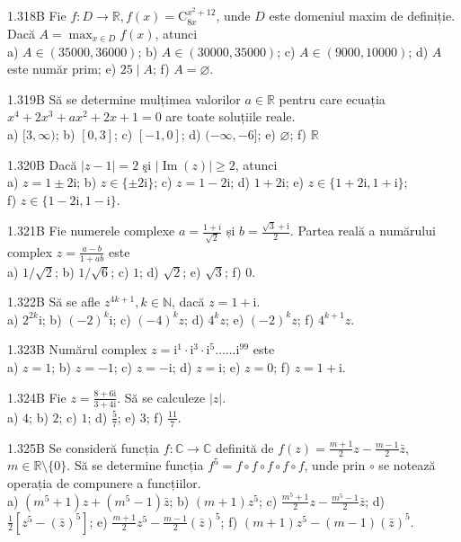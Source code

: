 \documentclass[11pt]{article}
\begin{document}
1.318B Fie $f: D \rightarrow \mathbb{R}, f(x)=\mathrm{C}_{8 x}^{x^{2}+12}$, unde $D$ este domeniul maxim de definiție. Dacă $A=\max _{x \in D} f(x)$, atunci\\ a) $A \in(35000,36000)$; b) $A \in(30000,35000)$; c) $A \in(9000,10000)$; d) $A$ este număr prim; e) $25 \mid A$; f) $A=\varnothing$.

1.319B Să se determine mulțimea valorilor $a \in \mathbb{R}$ pentru care ecuația $x^{4}+2 x^{3}+a x^{2}+2 x+1=0$ are toate soluțiile reale.\\ a) $[3, \infty)$; b) $[0,3]$; c) $[-1,0]$; d) $(-\infty,-6]$; e) $\varnothing$; f) $\mathbb{R}$

1.320B Dacă $|z-1|=2$ şi $|\operatorname{Im}(z)| \geq 2$, atunci\\ a) $z=1 \pm 2 \mathrm{i}$; b) $z \in \{\pm 2\mathrm{i}\}$; c) $z=1-2\mathrm{i}$; d) $1+2\mathrm{i}$; e) $z \in\{1+2\mathrm{i},1+\mathrm{i}\}$;\\ f) $z \in\{1-2 \mathrm{i}, 1-\mathrm{i}\}$.

1.321B Fie numerele complexe $a=\frac{1+i}{\sqrt{2}}$ și $b=\frac{\sqrt{3}+\mathrm{i}}{2}$. Partea reală a numărului complex $z=\frac{a-b}{1+a b}$ este\\ a) $1 / \sqrt{2}$; b) $1 / \sqrt{6}$; c) $1$; d) $\sqrt{2}$; e) $\sqrt{3}$; f) $0$.

1.322B Să se afle $z^{4 k+1}, k \in \mathbb{N}$, dacă $z=1+\mathrm{i}$.\\ a) $2^{2 k} \mathrm{i}$; b) $(-2)^{k} \mathrm{i}$; c) $(-4)^{k} z$; d) $4^{k} z$; e) $(-2)^{k} z$; f) $4^{k+1} z$.

1.323B Numărul complex $z=\mathrm{i}^{1} \cdot \mathrm{i}^{3} \cdot \mathrm{i}^{5} \ldots \ldots \mathrm{i}^{99}$ este\\ a) $z=1$; b) $z=-1$; c) $z=-\mathrm{i}$; d) $z=\mathrm{i}$; e) $z=0$; f) $z=1+\mathrm{i}$.

1.324B Fie $z=\frac{8+6 \mathrm{i}}{3+4 \mathrm{i}}$. Să se calculeze $|z|$.\\ a) $4$; b) $2$; c) $1$; d) $\frac{5}{7}$; e) $3$; f) $\frac{11}{7}$.

1.325B Se consideră funcția $f: \mathbb{C} \rightarrow \mathbb{C}$ definită de $f(z)=\frac{m+1}{2} z-\frac{m-1}{2} \bar{z}$, $m \in \mathbb{R} \setminus\{0\}$. Să se determine funcția $f^{5}=f \circ f \circ f \circ f \circ f$, unde prin $\circ$ se notează operația de compunere a funcțiilor.\\ a) $\left(m^{5}+1\right) z+\left(m^{5}-1\right) \bar{z}$; b) $(m+1) z^{5}$; c) $\frac{m^{5}+1}{2} z-\frac{m^{5}-1}{2} \bar{z}$; d) $\frac{1}{2}\left[z^{5}-(\bar{z})^{5}\right]$; e) $\frac{m+1}{2} z^{5}-\frac{m-1}{2}(\bar{z})^{5}$; f) $(m+1) z^{5}-(m-1)(\bar{z})^{5}$.
\end{document}
